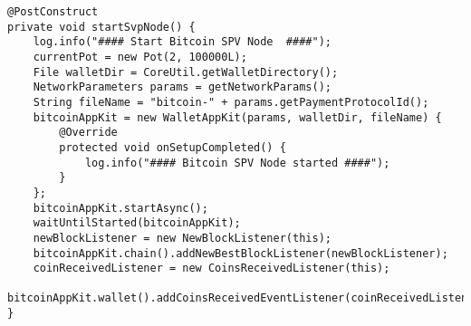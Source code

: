 \begin{lstlisting}[basicstyle=\small] %or \tiny or \small or \footnotesize etc.
@PostConstruct
private void startSvpNode() {
    log.info("#### Start Bitcoin SPV Node  ####");
    currentPot = new Pot(2, 100000L);
    File walletDir = CoreUtil.getWalletDirectory();
    NetworkParameters params = getNetworkParams();
    String fileName = "bitcoin-" + params.getPaymentProtocolId();
    bitcoinAppKit = new WalletAppKit(params, walletDir, fileName) {
        @Override
        protected void onSetupCompleted() {
            log.info("#### Bitcoin SPV Node started ####");
        }
    };
    bitcoinAppKit.startAsync();
    waitUntilStarted(bitcoinAppKit);
    newBlockListener = new NewBlockListener(this);
    bitcoinAppKit.chain().addNewBestBlockListener(newBlockListener);
    coinReceivedListener = new CoinsReceivedListener(this);
    bitcoinAppKit.wallet().addCoinsReceivedEventListener(coinReceivedListener);
}
\end{lstlisting}

